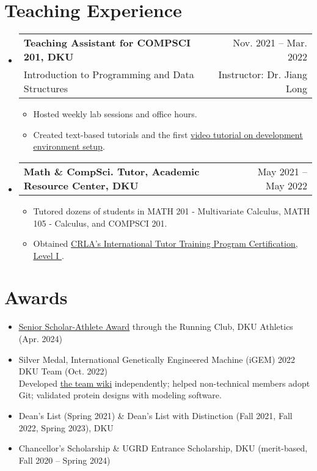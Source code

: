 \documentclass[letterpaper,11pt]{article}
\makeatletter
\newcommand{\CVItem}[1]{
  \item{\small
    {#1 \vspace{-2pt}}
  }
}
\newcommand{\CVSubheadingFrame}[1]{
  \vspace{-2pt}\item
    \begin{tabular*}{0.97\textwidth}[t]{l@{\extracolsep{\fill}}r}
        #1
    \end{tabular*}\vspace{-7pt}
}
\newcommand{\CVSubheading}[4]{\CVSubheadingFrame
    {\textbf{#1} & #2 \\
        \small#3 & #4 \\
    }}
\newcommand{\CVSubHeadingListStart}{\begin{itemize}[leftmargin=0.5cm, label={}]}
\newcommand{\CVSubHeadingListEnd}{\end{itemize}}
\newcommand{\CVItemListStart}{\begin{itemize}}
\newcommand{\CVItemListEnd}{\end{itemize}\vspace{-5pt}}
\newcommand{\uhref}[2]{\href{#1}{\underline{#2}}}
\makeatother
\begin{document}
\begin{refsection}
    \nocite{luo2024fedcampus}
    \printbibliography[title=Presentation]
\end{refsection}

\section{Teaching Experience}
\CVSubHeadingListStart
\CVSubheading
{Teaching Assistant for COMPSCI 201, DKU}{Nov. 2021 -- Mar. 2022}
{Introduction to Programming and Data Structures}
{Instructor: Dr. Jiang Long}
\CVItemListStart
\CVItem
{Hosted weekly lab sessions and office hours.}
\CVItem
{Created text-based tutorials and the first
    \uhref{https://www.youtube.com/watch?v=yiL-ULPBkvE}
    {video tutorial on development environment setup}.
}
\CVItemListEnd

\CVSubheadingFrame
{\textbf{Math \& CompSci. Tutor, Academic Resource Center, DKU}&
    May 2021 -- May 2022
}
\CVItemListStart
\CVItem
{Tutored dozens of students in MATH 201 - Multivariate Calculus,
    MATH 105 - Calculus,
    and COMPSCI 201.
}
\CVItem
{Obtained \uhref
    {https://github.com/SichangHe/curriculum_vitae/files/11665403/CRLA_certificate.pdf}
    {CRLA's International Tutor Training Program Certification,
        Level I
    }.}
\CVItemListEnd
\CVSubHeadingListEnd

\section{Awards}
\begin{itemize}
    \item \uhref{https://github.com/SichangHe/curriculum_vitae/files/15110729/scholar_athelete_award_DKU_running_club.pdf}
    {Senior Scholar-Athlete Award} through the Running Club,
    DKU Athletics (Apr. 2024)

    \item Silver Medal, International Genetically Engineered Machine (iGEM)
    2022 DKU Team (Oct. 2022)\\{\small
    Developed \uhref{https://github.com/SichangHe/igem-2022-dku-backup}
    {the team wiki} independently; helped non-technical members adopt Git;
    validated protein designs with modeling software.
    }
    \vspace{-4pt}
    \item Dean's List (Spring 2021) \&
    Dean's List with Distinction (Fall 2021, Fall 2022, Spring 2023),
    DKU
    \vspace{-4pt}
    \item Chancellor's Scholarship \& UGRD Entrance Scholarship, DKU
    (merit-based, Fall 2020 -- Spring 2024)
    \vspace{-4pt}
\end{itemize}
\end{document}
